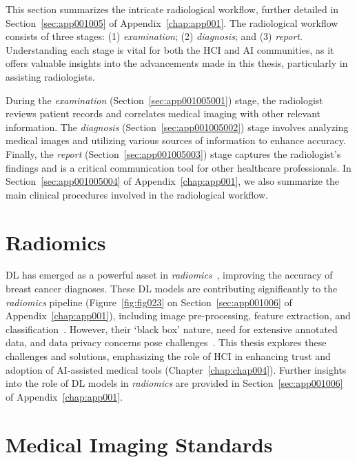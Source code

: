 This section summarizes the intricate radiological workflow, further detailed in Section~\ref{sec:app001005} of Appendix~\ref{chap:app001}.
The radiological workflow consists of three stages:
(1) {\it examination};
(2) {\it diagnosis}; and
(3) {\it report}.
Understanding each stage is vital for both the \ac{HCI} and \ac{AI} communities, as it offers valuable insights into the advancements made in this thesis, particularly in assisting radiologists.

During the {\it examination} (Section~\ref{sec:app001005001}) stage, the radiologist reviews patient records and correlates medical imaging with other relevant information.
The {\it diagnosis} (Section~\ref{sec:app001005002}) stage involves analyzing medical images and utilizing various sources of information to enhance accuracy.
Finally, the {\it report} (Section~\ref{sec:app001005003}) stage captures the radiologist's findings and is a critical communication tool for other healthcare professionals.
In Section~\ref{sec:app001005004} of Appendix~\ref{chap:app001}, we also summarize the main clinical procedures involved in the radiological workflow.

\section{Radiomics}
\label{sec:chap002006}

\ac{DL} has emerged as a powerful asset in {\it radiomics}~\cite{litjens2017survey}, improving the accuracy of breast cancer diagnoses.
These \ac{DL} models are contributing significantly to the {\it radiomics} pipeline (Figure~\ref{fig:fig023} on Section~\ref{sec:app001006} of Appendix~\ref{chap:app001}), including image pre-processing, feature extraction, and classification~\cite{10.1007/978-3-030-59716-0_71}.
However, their `black box' nature, need for extensive annotated data, and data privacy concerns pose challenges~\cite{litjens2017survey}.
This thesis explores these challenges and solutions, emphasizing the role of \ac{HCI} in enhancing trust and adoption of \ac{AI}-assisted medical tools (Chapter~\ref{chap:chap004}).
Further insights into the role of \ac{DL} models in {\it radiomics} are provided in Section~\ref{sec:app001006} of Appendix~\ref{chap:app001}.

\section{Medical Imaging Standards}
\label{sec:chap002007}

